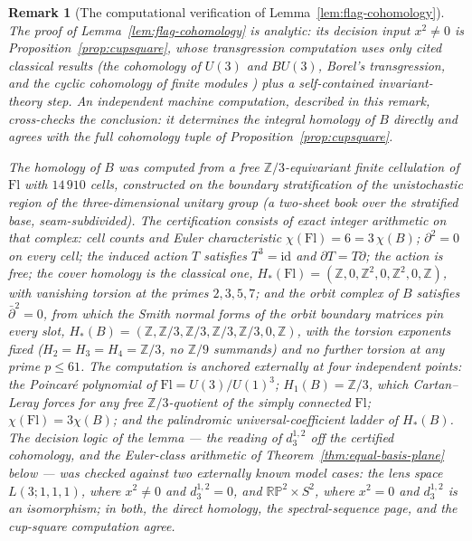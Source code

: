 \documentclass[11pt,a4paper]{article}
\newtheorem{remark}[theorem]{Remark}
\begin{document}
\begin{remark}[The computational verification of Lemma~\ref{lem:flag-cohomology}]
\label{rem:machine-certificate}
The proof of Lemma~\ref{lem:flag-cohomology} is analytic: its decision input
$x^2\ne0$ is Proposition~\ref{prop:cupsquare}, whose transgression
computation uses only cited classical results (the cohomology of
$U(3)$ and $BU(3)$, Borel's transgression, and the cyclic cohomology of finite
modules \cite{MilnorStasheff1974,HatcherSS,Brown1982}) plus a self-contained
invariant-theory step. An independent machine computation, described in this
remark, cross-checks the conclusion: it determines the integral homology of
$B$ directly and agrees with the full cohomology tuple of
Proposition~\ref{prop:cupsquare}.

The homology of $B$ was computed from a free
$\mathbb Z/3$-equivariant finite cellulation of $\mathrm{Fl}$ with
$14\,910$ cells, constructed on the boundary stratification of the
unistochastic region of the three-dimensional unitary group (a two-sheet book
over the stratified base, seam-subdivided). The certification consists of
exact integer arithmetic on that complex: cell counts and Euler
characteristic $\chi(\mathrm{Fl})=6=3\,\chi(B)$; $\partial^2=0$ on every
cell; the induced action $T$ satisfies $T^3=\mathrm{id}$ and
$\partial T=T\partial$; the action is free; the cover homology is the
classical one, $H_*(\mathrm{Fl})=(\mathbb Z,0,\mathbb Z^2,0,\mathbb Z^2,0,
\mathbb Z)$, with vanishing torsion at the primes $2,3,5,7$; and the orbit
complex of $B$ satisfies $\bar\partial^2=0$, from which the Smith normal
forms of the orbit boundary matrices pin every slot,
$H_*(B)=(\mathbb Z,\mathbb Z/3,\mathbb Z/3,\mathbb Z/3,\mathbb Z/3,0,\mathbb
Z)$, with the torsion exponents fixed ($H_2=H_3=H_4=\mathbb Z/3$, no
$\mathbb Z/9$ summands) and no further torsion at any prime $p\le61$. The
computation is anchored externally at four independent points: the
Poincar\'e polynomial of $\mathrm{Fl}=U(3)/U(1)^3$; $H_1(B)=\mathbb Z/3$,
which Cartan--Leray forces for any free $\mathbb Z/3$-quotient of the simply
connected $\mathrm{Fl}$; $\chi(\mathrm{Fl})=3\chi(B)$; and the palindromic
universal-coefficient ladder of $H_*(B)$. The decision logic of the lemma
--- the reading of $d_3^{1,2}$ off the certified cohomology, and the
Euler-class arithmetic of Theorem~\ref{thm:equal-basis-plane} below --- was
checked against two externally known model cases: the lens space
$L(3;1,1,1)$, where $x^2\ne0$ and $d_3^{1,2}=0$, and
$\mathbb{RP}^2\times S^2$, where $x^2=0$ and $d_3^{1,2}$ is an isomorphism;
in both, the direct homology, the spectral-sequence page, and the cup-square
computation agree.


\end{remark}
\end{document}
